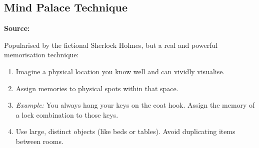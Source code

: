 \subsection*{Mind Palace Technique}
\textbf{Source:} \cite{metivierMagneticMemoryMethod2024}

Popularised by the fictional Sherlock Holmes, but a real and powerful memorisation technique:

\begin{enumerate}
  \item Imagine a physical location you know well and can vividly visualise.
  \item Assign memories to physical spots within that space.
  \item \textit{Example:} You always hang your keys on the coat hook. Assign the memory of a lock combination to those keys.
  \item Use large, distinct objects (like beds or tables). Avoid duplicating items between rooms.
\end{enumerate}